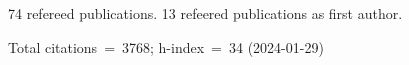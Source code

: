 74 refereed publications. 13 refeered publications as first author.

Total citations~=~3768; h-index~=~34 (2024-01-29)